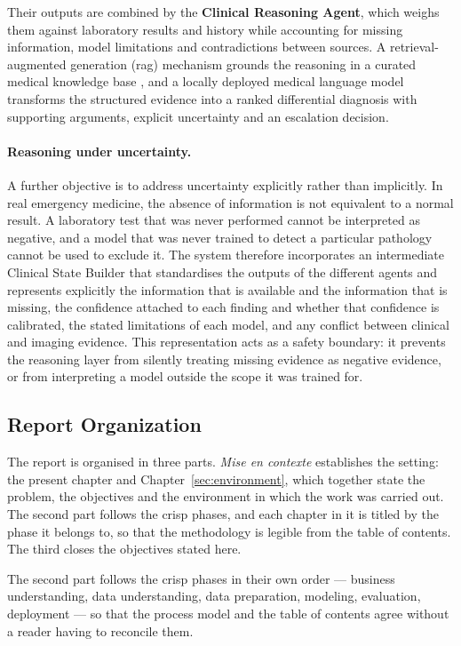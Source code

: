 Their outputs are combined by the \textbf{Clinical Reasoning Agent}, which weighs them
against laboratory results and history while accounting for missing information, model
limitations and contradictions between sources. A retrieval-augmented generation
(\gls{rag}) mechanism grounds the reasoning in a curated medical knowledge base
\cite{lewis2020rag}, and a locally deployed
medical language model transforms the structured evidence into a ranked differential
diagnosis with supporting arguments, explicit uncertainty and an escalation decision.

\paragraph{Reasoning under uncertainty.} A further objective is to address uncertainty
explicitly rather than implicitly. In real emergency medicine, the absence of information
is not equivalent to a normal result. A laboratory test that was never performed cannot be
interpreted as negative, and a model that was never trained to detect a particular
pathology cannot be used to exclude it. The system therefore incorporates an intermediate
Clinical State Builder that standardises the outputs of the different agents and
represents explicitly the information that is available and the information that is
missing, the confidence attached to each finding and whether that confidence is
calibrated, the stated limitations of each model, and any conflict between clinical and
imaging evidence. This representation acts as a safety boundary: it prevents the reasoning
layer from silently treating missing evidence as negative evidence, or from interpreting a
model outside the scope it was trained for.

\subsection{Report Organization}
\label{subsec:organization}

The report is organised in three parts. \emph{Mise en contexte} establishes the setting: the
present chapter and Chapter~\ref{sec:environment}, which together state the problem, the
objectives and the environment in which the work was carried out. The second part follows the
\gls{crisp} phases, and each chapter in it is titled by the phase it belongs to, so that the
methodology is legible from the table of contents. The third closes the objectives stated
here.

The second part follows the \gls{crisp} phases in their own order --- business understanding,
data understanding, data preparation, modeling, evaluation, deployment --- so that the process
model and the table of contents agree without a reader having to reconcile them.

